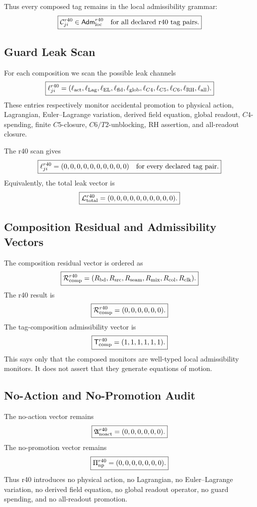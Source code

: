 Thus every composed tag remains in the local admissibility grammar:
\[
\boxed{
\mathcal C_{ji}^{r40}\in\mathsf{Adm}_{\rm loc}^{r40}
\quad\hbox{for all declared r40 tag pairs.}
}
\]

\subsection{Guard Leak Scan}
\label{subsec:r40-guard-leak-scan}

For each composition we scan the possible leak channels
\[
\boxed{
\ell^{r40}_{ji}
=
(\ell_{\rm act},\ell_{\rm Lag},\ell_{\rm EL},\ell_{\rm fld},
\ell_{\rm glob},\ell_{C4},\ell_{C5},\ell_{C6},\ell_{\rm RH},\ell_{\rm all}).
}
\]
These entries respectively monitor accidental promotion to physical action,
Lagrangian, Euler--Lagrange variation, derived field equation, global readout,
\(C4\)-spending, finite \(C5\)-closure, \(C6/T2\)-unblocking, RH assertion, and
all-readout closure.

The r40 scan gives
\[
\boxed{
\ell^{r40}_{ji}=(0,0,0,0,0,0,0,0,0,0)
\quad\hbox{for every declared tag pair.}
}
\]
Equivalently, the total leak vector is
\[
\boxed{
\mathcal L_{\rm total}^{r40}=(0,0,0,0,0,0,0,0,0,0).
}
\]

\subsection{Composition Residual and Admissibility Vectors}
\label{subsec:r40-composition-residual-admissibility-vectors}

The composition residual vector is ordered as
\[
\boxed{
\mathcal R_{\rm comp}^{r40}
=
(R_{\rm bd},R_{\rm src},R_{\rm seam},R_{\rm mix},R_{\rm col},R_{\rm clk}).
}
\]
The r40 result is
\[
\boxed{
\mathcal R_{\rm comp}^{r40}=(0,0,0,0,0,0).
}
\]
The tag-composition admissibility vector is
\[
\boxed{
\mathsf T_{\rm comp}^{r40}=(1,1,1,1,1,1).
}
\]
This says only that the composed monitors are well-typed local admissibility
monitors.  It does not assert that they generate equations of motion.

\subsection{No-Action and No-Promotion Audit}
\label{subsec:r40-no-action-no-promotion-audit}

The no-action vector remains
\[
\boxed{
\mathfrak A_{\rm noact}^{r40}=(0,0,0,0,0,0).
}
\]
The no-promotion vector remains
\[
\boxed{
\Pi_{\rm np}^{r40}=(0,0,0,0,0,0,0).
}
\]
Thus r40 introduces no physical action, no Lagrangian, no Euler--Lagrange
variation, no derived field equation, no global readout operator, no guard
spending, and no all-readout promotion.

